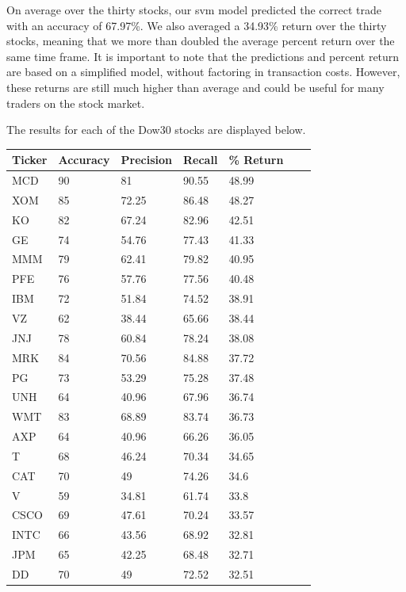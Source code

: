 \documentclass{article}
\begin{document}
On average over the thirty stocks, our svm model predicted the correct trade with an accuracy of 67.97\%. We also averaged a 34.93\% return over the thirty stocks, meaning that we more than doubled the average percent return over the same time frame. It is important to note that the predictions and percent return are based on a simplified model, without factoring in transaction costs. However, these returns are still much higher than average and could be useful for many traders on the stock market.

The results for each of the Dow30 stocks are displayed below.

\begin{table}[h]
  \begin{tabular}{@{}lllllll@{}}
    \toprule
    Ticker & Accuracy & Precision & Recall & \% Return & \\ \midrule
    MCD & 90 & 81 & 90.55 & 48.99 & \\
    XOM & 85 & 72.25 & 86.48 & 48.27 & \\
    KO & 82 & 67.24 & 82.96 & 42.51 & \\
    GE & 74 & 54.76 & 77.43 & 41.33 & \\
    MMM & 79 & 62.41 & 79.82 & 40.95 & \\
    PFE & 76 & 57.76 & 77.56 & 40.48 & \\
    IBM & 72 & 51.84 & 74.52 & 38.91 & \\
    VZ & 62 & 38.44 & 65.66 & 38.44 & \\
    JNJ & 78 & 60.84 & 78.24 & 38.08 & \\
    MRK & 84 & 70.56 & 84.88 & 37.72 & \\
    PG & 73 & 53.29 & 75.28 & 37.48 & \\
    UNH & 64 & 40.96 & 67.96 & 36.74 & \\
    WMT & 83 & 68.89 & 83.74 & 36.73 & \\
    AXP & 64 & 40.96 & 66.26 & 36.05 & \\
    T & 68 & 46.24 & 70.34 & 34.65 & \\
    CAT & 70 & 49 & 74.26 & 34.6 & \\
    V & 59 & 34.81 & 61.74 & 33.8 & \\
    CSCO & 69 & 47.61 & 70.24 & 33.57 & \\
    INTC & 66 & 43.56 & 68.92 & 32.81 & \\
    JPM & 65 & 42.25 & 68.48 & 32.71 & \\
    DD & 70 & 49 & 72.52 & 32.51 & \\

\end{tabular}
\end{table}
\end{document}
